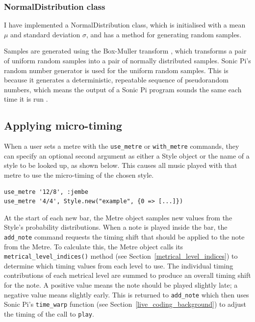 \documentclass[12pt,twoside,openright]{report}
\begin{document}
\subsubsection{NormalDistribution class} \label{normal_distribution}

I have implemented a NormalDistribution class, which is initialised with a mean $\mu$ and standard deviation
$\sigma$, and has a method for generating random samples.

Samples are generated using the
Box-Muller transform \cite{box1958}, which transforms a pair of uniform random
samples into a pair of normally distributed samples. Sonic Pi's random number
generator is used for the uniform random samples. This is because it generates a
deterministic, repeatable sequence of pseudorandom numbers, which means the output of
a Sonic Pi program sounds the same each time it is run \cite{aaron2016}.


\subsection{Applying micro-timing} \label{applying_micro-timing}

When a user sets a metre with the \verb'use_metre' or \verb'with_metre' commands, they can
specify an optional second argument as either a Style object or the name of a
style to be looked up, as shown below. This causes all music played with that metre to use the micro-timing of the chosen style.
\begin{verbatim}
use_metre '12/8', :jembe
use_metre '4/4', Style.new("example", {0 => [...]})
\end{verbatim}

At the start of each new bar, the Metre object samples new values from the
Style's probability distributions. When a note is played inside the bar, the
\verb'add_note' command requests the timing shift that should be applied to the note
from the Metre. To calculate this, the Metre object calls its
\verb'metrical_level_indices()' method (see Section~\ref{metrical_level_indices}) to determine which timing
values from each level to use. The individual timing contributions of each
metrical level are summed to produce an overall timing shift for the
note. A positive value means the note should be played slightly late; a negative
value means slightly early. This is returned to \verb'add_note' which then uses Sonic Pi's \verb'time_warp' function (see Section~\ref{live_coding_background}) to adjust the timing of the call to \verb'play'.
\end{document}
